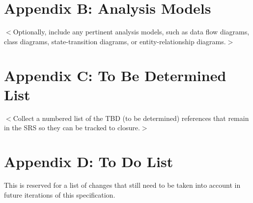 \documentclass{scrreprt}
\begin{document}
  \section{Appendix B: Analysis Models}

    $<$Optionally, include any pertinent analysis models, such as data flow
    diagrams, class diagrams, state-transition diagrams, or entity-relationship
    diagrams.$>$

  \section{Appendix C: To Be Determined List}

    $<$Collect a numbered list of the TBD (to be determined) references that
    remain in the SRS so they can be tracked to closure.$>$

  \section{Appendix D: To Do List}

    This is reserved for a list of changes that still need to be taken into
    account in future iterations of this specification.
\end{document}
